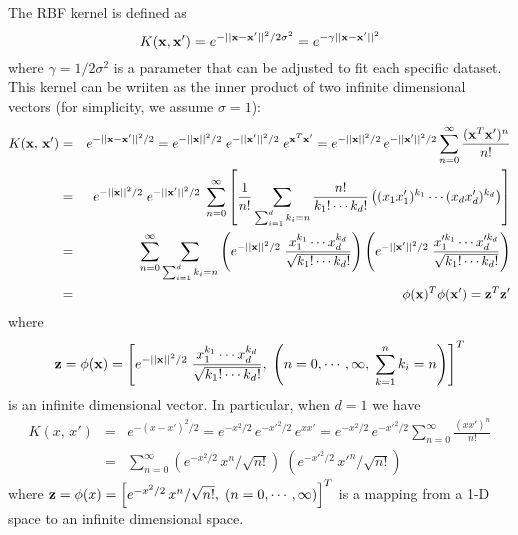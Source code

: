 \documentclass{article}
\begin{document}
\begin{itemize}
  The RBF kernel is defined as
  \begin{equation}
    K({\bf x},{\bf x}')=e^{-||{\bf x}-{\bf x}'||^2/2\sigma^2}	
    =e^{-\gamma||{\bf x}-{\bf x}'||^2}	
  \end{equation}
  where $\gamma=1/2\sigma^2$ is a parameter that can be adjusted to fit
  each specific dataset. This kernel can be wriiten as the inner product of 
  two infinite dimensional vectors (for simplicity, we assume $\sigma=1$):
  \begin{eqnarray}
    K({\bf x},\,{\bf x}')&=&e^{-||{\bf x}-{\bf x}'||^2/2}
    =e^{-||{\bf x}||^2/2}\; e^{-||{\bf x}'||^2/2}\; e^{{\bf x}^T{\bf x}'}
    =e^{-||{\bf x}||^2/2}\, e^{-||{\bf x}'||^2/2}
    \sum_{n=0}^\infty \frac{({\bf x}^T{\bf x}')^n}{n!}
    \nonumber\\
    &=&e^{-||{\bf x}||^2/2} \; e^{-||{\bf x}'||^2/2}\;\sum_{n=0}^\infty \left[ 
    \frac{1}{n!}\sum_{\sum_{i=1}^d k_i=n} \frac{n!}{k_1!\cdots k_d! }
    \left((x_1x'_1)^{k_1}\cdots (x_dx'_d)^{k_d}\right) \right]
    \nonumber\\
    &=&\sum_{n=0}^\infty \sum_{\sum_{i=1}^d k_i=n}
    \left(e^{-||{\bf x} ||^2/2}\; \frac{x _1^{k_1}\cdots x _d^{k_d}}{\sqrt{k_1!\cdots k_d!}}\right)
    \left(e^{-||{\bf x}'||^2/2}\; \frac{x_1^{\prime k_1}\cdots x_d^{\prime k_d}}{\sqrt{k_1!\cdots k_d!}}\right)
    \nonumber\\
    &=&\phi({\bf x})^T \phi({\bf x}')={\bf z}^T{\bf z}'
  \end{eqnarray}
  where
  \begin{equation}
    {\bf z}=\phi({\bf x})=\left[ e^{-||{\bf x}||^2/2}\;\frac{x_1^{k_1}\cdots x_d^{k_d}}{\sqrt{ k_1!\cdots k_d!}},
      \;\left(n=0,\cdots,\infty,\;\sum_{k=1}^nk_i=n\right) \right]^T
  \end{equation}
  is an infinite dimensional vector. In particular, when $d=1$ we have
  \begin{eqnarray}
    K(x,\,x')&=&e^{-(x-x')^2/2}=e^{-x^2/2}\, e^{-x'^2/2}\, e^{xx'}
    =e^{-x^2/2}\, e^{-x'^2/2} \sum_{n=0}^\infty \frac{(xx')^n}{n!}
    \nonumber\\
    &=&\sum_{n=0}^\infty (e^{-x^2/2}\,x^n/\sqrt{n!})\;(e^{-x'^2/2}\,x'^n/\sqrt{n!})
  \end{eqnarray}
  where ${\bf z}=\phi(x)=\left[ e^{-x^2/2}\,x^n/\sqrt{n!},\;(n=0,\cdots,\infty)\right]^T$
  is a mapping from a 1-D space to an infinite dimensional space.



\end{itemize}
\end{document}
